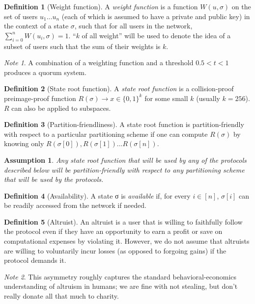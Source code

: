 \documentclass[11pt,a4paper]{report}
\theoremstyle{plain}
\newtheorem{assm}{Assumption}[chapter]
\theoremstyle{definition}
\newtheorem{defn}{Definition}[chapter]
\theoremstyle{remark}
\newtheorem*{note}{Note}
\begin{document}
\begin{defn}[Weight function]
A \emph{weight function} is a function $W(u, \sigma)$ on the set of users $u_1 ... u_n$ (each of which is assumed to have a private and public key) in the context of a state $\sigma$, such that for all users in the network, $\sum_{i=0}^n W(u_i, \sigma) = 1$. ``$k$ of all weight'' will be used to denote the idea of a subset of users such that the sum of their weights is $k$.
\end{defn}

\begin{note}
A combination of a weighting function and a threshold $0.5 < t < 1$ produces a quorum system.
\end{note}

\begin{defn}[State root function]
A \emph{state root function} is a collision-proof preimage-proof function $R(\sigma) \rightarrow x \in \{0, 1\}^k$ for some small $k$ (usually $k = 256$). $R$ can also be applied to subspaces.
\end{defn}

\begin{defn}[Partition-friendliness]
A state root function is partition-friendly with respect to a particular partitioning scheme if one can compute $R(\sigma)$ by knowing only $R(\sigma[0]), R(\sigma[1]) ... R(\sigma[n])$.
\end{defn}

\begin{assm}
Any state root function that will be used by any of the protocols described below will be partition-friendly with respect to any partitioning scheme that will be used by the protocols.
\end{assm}

\begin{defn}[Availability]
A state σ is \emph{available} if, for every $i \in [n]$, $\sigma[i]$ can be readily accessed from the network if needed.
\end{defn}

\begin{defn}[Altruist]
An altruist is a user that is willing to faithfully follow the protocol even if they have an opportunity to earn a profit or save on computational expenses by violating it. However, we do not assume that altruists are willing to voluntarily incur losses (as opposed to forgoing gains) if the protocol demands it.
\end{defn}

\begin{note}
This asymmetry roughly captures the standard behavioral-economics understanding of altruism in humans; we are fine with not stealing, but don't really donate all that much to charity.
\end{note}
\end{document}
